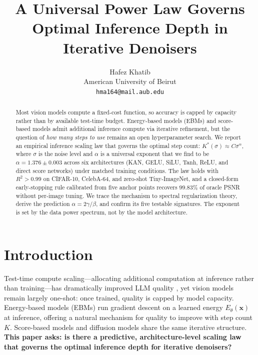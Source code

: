\documentclass[letterpaper]{article}
\title{A Universal Power Law Governs Optimal Inference Depth in Iterative Denoisers}
\author{%
  Hafez Khatib \\
  American University of Beirut \\
  \texttt{hma164@mail.aub.edu}
}
\newcommand{\xx}{\mathbf{x}}
\begin{document}
\maketitle

\begin{abstract}
Most vision models compute a fixed-cost function, so accuracy is capped by capacity rather than by available test-time budget. Energy-based models (EBMs) and score-based models admit additional inference compute via iterative refinement, but the question of \emph{how many steps to use} remains an open hyperparameter search. We report an empirical inference scaling law that governs the optimal step count: $K^{*}(\sigma) \approx C\sigma^{\alpha}$, where $\sigma$ is the noise level and $\alpha$ is a universal exponent that we find to be $\alpha = 1.376 \pm 0.003$ across six architectures (KAN, GELU, SiLU, Tanh, ReLU, and direct score networks) under matched training conditions. The law holds with $R^2 > 0.99$ on CIFAR-10, CelebA-64, and zero-shot Tiny-ImageNet, and a closed-form early-stopping rule calibrated from five anchor points recovers $99.83\%$ of oracle PSNR without per-image tuning. We trace the mechanism to spectral regularization theory, derive the prediction $\alpha = 2\gamma/\beta$, and confirm its five testable signatures. The exponent is set by the data power spectrum, not by the model architecture.
\end{abstract}

\section{Introduction}
\label{sec:intro}

Test-time compute scaling---allocating additional computation at inference rather than training---has dramatically improved LLM quality \citep{snell2024llm,brown2024llm_scaling}, yet vision models remain largely one-shot: once trained, quality is capped by model capacity. Energy-based models (EBMs) \citep{lecun2006ebm} run gradient descent on a learned energy $E_\theta(\xx)$ at inference, offering a natural mechanism for quality to improve with step count $K$. Score-based models \citep{song2019score} and diffusion models \citep{ho2020ddpm} share the same iterative structure. \textbf{This paper asks: is there a predictive, architecture-level scaling law that governs the optimal inference depth for iterative denoisers?}
\end{document}
